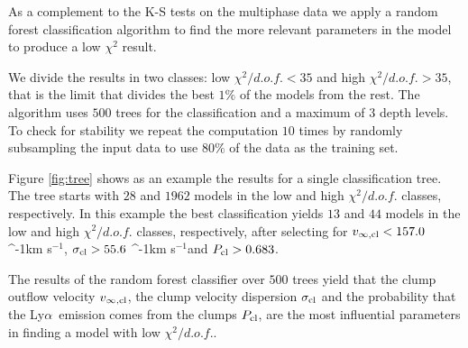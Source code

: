 \documentclass[a4paper,fleqn,usenatbib]{mnras}
\newcommand{\lya}{\ifmmode{{\rm Ly}\alpha}\else Ly$\alpha$\ \fi}
\newcommand{\kms}{\ifmmode\mathrm{km\ s}^{-1}\else km s$^{-1}$\fi}
\begin{document}
As a complement to the K-S tests on the multiphase data 
we apply a random forest classification algorithm
\citep{james2014introduction} to find the
more relevant parameters in the model to produce a low $\chi^2$
result. 


We divide
the results in two classes: low $\chi^2/d.o.f.<35$ and high
$\chi^2/d.o.f.>35$, that is the limit that divides the best $1\%$ of
the models from the rest. 
The algorithm uses $500$ trees for the classification and a
maximum of $3$ depth levels. 
To check for stability we repeat the computation $10$ times by
randomly subsampling the input data to use $80\%$ of the data as
the training set.

Figure \ref{fig:tree} shows as an example the results for a
single classification tree.
The tree starts with $28$ and $1962$ models in the low and high
$\chi^2/d.o.f.$ classes, respectively. 
In this example the best classification
yields $13$ and $44$ models in the low and high $\chi^2/d.o.f.$
classes, respectively, after selecting for $v_{\infty,{\rm cl}}<157.0$ \kms,
$\sigma_{{\rm cl}}>55.6$ \kms and $P_{\rm cl}>0.683$. 

The results of the random forest classifier over $500$ trees yield
that the clump outflow velocity $v_{\infty,\rm{cl}}$, the clump
velocity dispersion $\sigma_{\rm cl}$ and the probability that the
\lya emission comes from the clumps $P_{\rm cl}$, are the most
influential parameters in finding a model with low $\chi^2/d.o.f.$.  
\end{document}
